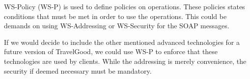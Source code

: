 \noindent
WS-Policy (WS-P) is used to define policies on operations. These policies states conditions that must be met in order to use the operations. This could be demands on using WS-Addressing or WS-Security for the SOAP messages.

If we would decide to include the other mentioned advanced technologies for a future version of TravelGood, we could use WS-P to enforce that these technologies are used by clients. While the addressing is merely convenience, the security if deemed necessary must be mandatory.




